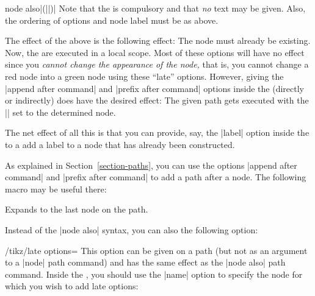 \begin{pathoperation}{node also}{|(||)|}
    Note that the  is compulsory and that \emph{no} text may be
    given. Also, the ordering of options and node label must be as above.

    The effect of the above is the following effect: The node  must
    already  be existing. Now, the  are executed in a local
    scope. Most of these options will have no effect since you \emph{cannot
    change the appearance of the node,} that is, you cannot change a red node
    into a green node using these ``late'' options. However, giving the
    |append after command| and |prefix after command| options inside the
     (directly or indirectly) does have the desired effect:
    The given path gets executed with the |\tikzlastnode| set to the determined
    node.

    The net effect of all this is that you can provide, say, the |label| option
    inside the  to a add a label to a node that has already been
    constructed.
\begin{codeexample}[]
\end{codeexample}
\end{pathoperation}

As explained in Section~\ref{section-paths}, you can use the options
|append after command| and |prefix after command| to add a path after a node.
The following macro may be useful there:
%
\begin{command}{\tikzlastnode}
    Expands to the last node on the path.
\end{command}

Instead of the |node also| syntax, you can also the following option:

\begin{key}{/tikz/late options=}
    This option can be given on a path (but not as an argument to a |node| path
    command) and has the same effect as the |node also| path command. Inside
    the , you should use the |name| option to specify the node
    for which you wish to add late options:
\begin{codeexample}[]
\end{codeexample}
\end{key}


